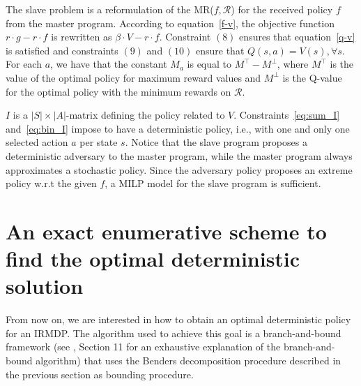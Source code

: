 \documentclass[runningheads,a4paper]{llncs}
\begin{document}
The slave problem is a reformulation of the MR($f, \mathcal{R}$) for the received policy $f$ from the master program. According to equation~\eqref{f-v}, the objective function $r \cdot g - r \cdot f$ is rewritten as $\beta \cdot V - r \cdot f$. 
% 
Constraint $(8)$ ensures that equation~\eqref{q-v} is satisfied and 
%
constraints $(9)$ and $(10)$ ensure that $Q(s, a) = V(s), \forall s $.
For each $a$, we have that the constant $M_a$ is equal to  $M^{\top} - M^{\perp}$, where  $M^{\top}$ is the value of the optimal policy for maximum reward values 
and $M^{\perp}$ is the Q-value for the optimal policy with the minimum rewards on $\mathcal{R}$. 

$I$ is a $|S|\times|A|$-matrix defining the policy related to $V$. 
Constraints~\eqref{eq:sum_I} and~\eqref{eq:bin_I} impose to  have a deterministic policy, i.e., with one and only one selected action $a$ per state $s$. Notice that the slave program proposes a deterministic adversary to the master program, while the master program always approximates a stochastic policy. Since the adversary policy proposes an extreme policy w.r.t the given $f$, a MILP model for the slave program is sufficient.   


\section{An exact enumerative scheme to find the optimal deterministic solution}\label{sec:bb} 

From now on, we are interested in how to obtain an optimal deterministic policy for an IRMDP.
The algorithm used to achieve this goal is a branch-and-bound framework (see \cite{bertsimas2005optimization}, Section 11 for an exhaustive explanation of the branch-and-bound algorithm) that uses the Benders decomposition procedure described in the previous section as bounding procedure. 
\end{document}
